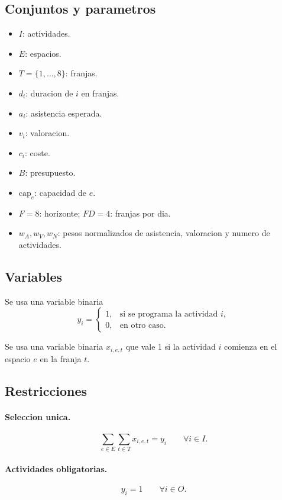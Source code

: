 \subsection{Conjuntos y parametros}

\begin{itemize}
\item $I$: actividades.
\item $E$: espacios.
\item $T=\{1,\ldots,8\}$: franjas.
\item $d_i$: duracion de $i$ en franjas.
\item $a_i$: asistencia esperada.
\item $v_i$: valoracion.
\item $c_i$: coste.
\item $B$: presupuesto.
\item $\mathrm{cap}_e$: capacidad de $e$.
\item $F=8$: horizonte; $FD=4$: franjas por dia.
\item $w_A,w_V,w_N$: pesos normalizados de asistencia, valoracion y numero de actividades.
\end{itemize}

\subsection{Variables}

Se usa una variable binaria
\[
y_i=
\begin{cases}
1,&\text{si se programa la actividad }i,\\
0,&\text{en otro caso.}
\end{cases}
\]

Se usa una variable binaria $x_{i,e,t}$ que vale 1 si la actividad $i$ comienza en el espacio $e$ en la franja $t$.

\subsection{Restricciones}

\paragraph{Seleccion unica.}
\[
\sum_{e\in E}\sum_{t\in T}x_{i,e,t}=y_i
\qquad\forall i\in I.
\]

\paragraph{Actividades obligatorias.}
\[
y_i=1\qquad\forall i\in O.
\]

